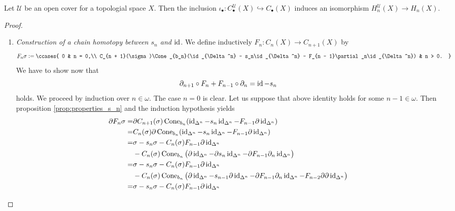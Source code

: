 \begin{theorem}
	\label{thm:inclusion_U_small}
	Let $\mathcal{U}$ be an open cover for a topologial space $X$. Then the inclusion $\iota_\bullet : C_\bullet^\mathcal{U}(X) \hookrightarrow C_\bullet(X)$ induces an isomorphism $H_n^\mathcal{U}(X) \to H_n(X)$.
\end{theorem}

\begin{proof}
	\begin{enumerate}[label = \textit{Step \arabic*:},wide = 0pt]
		\item \textit{Construction of a chain homotopy between $s_n$ and $\operatorname{id}$.} We define inductively $F_n : C_n(X) \to C_{n + 1}(X)$ by
			\begin{equation*}
				F_n\sigma := \ccases{
					0 & n = 0,\\
					C_{n + 1}(\sigma)\Cone_{b_n}(\id_{\Delta^n} - s_n\id_{\Delta^n} - F_{n - 1}\partial_n\id_{\Delta^n}) & n > 0.
				}
			\end{equation*}
			We have to show now that
			\begin{equation*}
				\partial_{n + 1} \circ F_n + F_{n - 1} \circ \partial_n = \operatorname{id} - s_n
			\end{equation*}
			\noindent holds. We proceed by induction over $n \in \omega$. The case $n = 0$ is clear. Let us suppose that above identity holds for some $n - 1 \in \omega$. Then proposition \ref{prop:properties_s_n} and the induction hypothesis yields 
			\begin{align*}
				\partial F_n\sigma =& \partial C_{n + 1}(\sigma)\Cone_{b_n}(\id_{\Delta^n} - s_n\id_{\Delta^n} - F_{n - 1}\partial \id_{\Delta^n})\\
				=& C_n(\sigma)\partial\Cone_{b_n}(\id_{\Delta^n} - s_n\id_{\Delta^n} - F_{n - 1}\partial\id_{\Delta^n})\\
				=& \sigma - s_n\sigma - C_n(\sigma)F_{n - 1}\partial\id_{\Delta^n}\\
				&- C_n(\sigma)\Cone_{b_n}\del[1]{\partial\id_{\Delta^n} - \partial s_n\id_{\Delta^n} - \partial F_{n - 1}\partial_n\id_{\Delta^n}}\\
				=& \sigma - s_n\sigma - C_n(\sigma)F_{n - 1}\partial\id_{\Delta^n}\\
				&- C_n(\sigma)\Cone_{b_n}\del[1]{\partial\id_{\Delta^n} - s_{n - 1}\partial\id_{\Delta^n} - \partial F_{n - 1}\partial_n\id_{\Delta^n} - F_{n - 2}\partial\partial\id_{\Delta^n}}\\
				=& \sigma - s_n\sigma - C_n(\sigma)F_{n - 1}\partial\id_{\Delta^n}\\

\end{align*}
\end{enumerate}
\end{proof}

